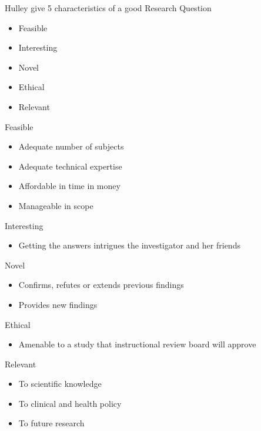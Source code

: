 \documentclass[14pt]{beamer}
\begin{document}
\begin{frame}{Hulley \cite{Hulley2001} give 5 characteristics of a good
Research Question}
\begin{itemize}
\item Feasible
\item Interesting
\item Novel
\item Ethical
\item Relevant
\end{itemize}
\end{frame}

\begin{frame}{Feasible}
\begin{itemize}
\item Adequate number of subjects
\item Adequate technical expertise
\item Affordable in time in money
\item Manageable in scope
\end{itemize}
\end{frame}

\begin{frame}{Interesting}
\begin{itemize}
\item Getting the answers intrigues the investigator and her friends
\end{itemize}
\end{frame}

\begin{frame}{Novel}
\begin{itemize}
\item Confirms, refutes or extends previous findings
\item Provides new findings
\end{itemize}
\end{frame}

\begin{frame}{Ethical}
\begin{itemize}
\item Amenable to a study that instructional review board will approve
\end{itemize}
\end{frame}

\begin{frame}{Relevant}
\begin{itemize}
\item To scientific knowledge
\item To clinical and health policy
\item To future research
\end{itemize}
\end{frame}
\end{document}
